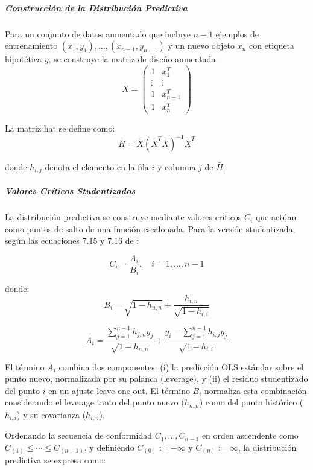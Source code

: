 \subparagraph{Construcción de la Distribución Predictiva}
Para un conjunto de datos aumentado que incluye $n-1$ ejemplos de entrenamiento $(x_1, y_1), \dots, (x_{n-1}, y_{n-1})$ y un nuevo objeto $x_n$ con etiqueta hipotética $y$, se construye la matriz de diseño aumentada:
\begin{equation}
\bar{X} = \begin{pmatrix}
1 & x_1^T \\
\vdots & \vdots \\
1 & x_{n-1}^T \\
1 & x_n^T
\end{pmatrix}
\end{equation}

La matriz hat se define como:
\begin{equation}
\bar{H} = \bar{X}(\bar{X}^T\bar{X})^{-1}\bar{X}^T
\end{equation}

donde $h_{i,j}$ denota el elemento en la fila $i$ y columna $j$ de $\bar{H}$.

\subparagraph{Valores Críticos Studentizados}
La distribución predictiva se construye mediante valores críticos $C_i$ que actúan como puntos de salto de una función escalonada. Para la versión studentizada, según las ecuaciones 7.15 y 7.16 de \textcite{Vovk2022}:

\begin{equation}
C_i = \frac{A_i}{B_i}, \quad i = 1, \dots, n-1
\end{equation}

donde:
\begin{equation}
B_i = \sqrt{1 - h_{n,n}} + \frac{h_{i,n}}{\sqrt{1 - h_{i,i}}}
\end{equation}

\begin{equation}
A_i = \frac{\sum_{j=1}^{n-1} h_{j,n} y_j}{\sqrt{1 - h_{n,n}}} + \frac{y_i - \sum_{j=1}^{n-1} h_{i,j} y_j}{\sqrt{1 - h_{i,i}}}
\end{equation}

El término $A_i$ combina dos componentes: (i) la predicción OLS estándar sobre el punto nuevo, normalizada por su palanca (leverage), y (ii) el residuo studentizado del punto $i$ en un ajuste leave-one-out. El término $B_i$ normaliza esta combinación considerando el leverage tanto del punto nuevo ($h_{n,n}$) como del punto histórico ($h_{i,i}$) y su covarianza ($h_{i,n}$).

Ordenando la secuencia de conformidad $C_1, \ldots, C_{n-1}$ en orden ascendente como $C_{(1)} \leq \cdots \leq C_{(n-1)}$, y definiendo $C_{(0)} := -\infty$ y $C_{(n)} := \infty$, la distribución predictiva se expresa como:

